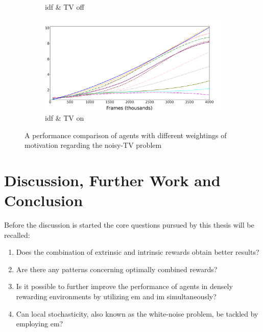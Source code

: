 \documentclass[draft,final]{vutinfth} %
\begin{document}
\begin{figure}[h]
\begin{adjustwidth}{-3.0cm}{-2.0cm}
\begin{subfigure}[t]{0.5\linewidth}
                \caption{\acrlong{idf} \& TV off}
            \end{subfigure}
            \begin{subfigure}[t]{0.5\linewidth}
                \centering
                \includegraphics[width=1\textwidth]{figures/breakout/tv/idf_TV.png}
                \caption{\acrlong{idf} \& TV on}
            \end{subfigure}
        \end{adjustwidth}
        \caption{A performance comparison of agents with different weightings of motivation regarding the noisy-TV problem}
        \label{fig:tv_problem}
    \end{figure}

    \glsresetall


    \chapter{Discussion, Further Work and Conclusion}\label{ch:discussion-and-further-work}

    Before the discussion is started the core questions pursued by this thesis will be recalled:

    \begin{enumerate}[label=(\alph*)]
        \item \label{q:a}Does the combination of extrinsic and intrinsic rewards obtain better results?
        \item \label{q:b}Are there any patterns concerning optimally combined rewards?
        \item \label{q:c}Is it possible to further improve the performance of agents in densely rewarding environments by utilizing \acrlong{em} and \acrlong{im} simultaneously?
        \item \label{q:d}Can local stochasticity, also known as the white-noise problem, be tackled by employing \acrlong{em}?
    \end{enumerate}
\end{document}
